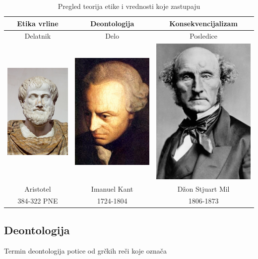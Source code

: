 \documentclass[a4paper]{article}
\begin{document}
\begin{table}
\begin{center}
\caption{Pregled teorija etike i vrednosti koje zastupaju}
\begin{tabular}{|c|c|c|} \hline
Etika vrline & Deontologija & Konsekvencijalizam\\ \hline
Delatnik & Delo & Posledice\\ \hline
\includegraphics[scale=.2]{slike/aristotel.jpg} & \includegraphics[scale=.2]{slike/kant.jpg} & \includegraphics[scale=.2]{slike/mil.jpg} \\Aristotel & Imanuel Kant & Džon Stjuart Mil\\ 384-322 PNE & 1724-1804 & 1806-1873\\ 
\hline
\end{tabular}
\label{tab:tabela1}
\end{center}
\end{table}

\subsection{Deontologija}

Termin deontologija potice od grčkih reči koje označa
\end{document}
